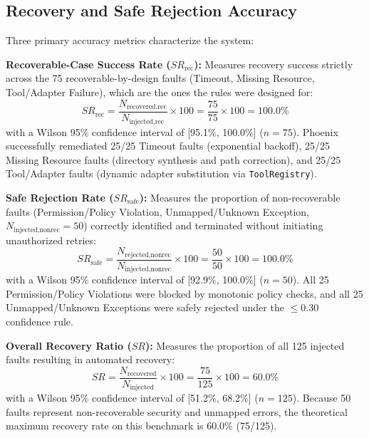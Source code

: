\documentclass[conference]{IEEEtran}
\begin{document}
\subsection{Recovery and Safe Rejection Accuracy}
Three primary accuracy metrics characterize the system:

\textbf{Recoverable-Case Success Rate ($SR_{\text{rec}}$):} Measures recovery success strictly across the 75 recoverable-by-design faults (Timeout, Missing Resource, Tool/Adapter Failure), which are the ones the rules were designed for:
\begin{equation}
SR_{\text{rec}} = \frac{N_{\text{recovered,rec}}}{N_{\text{injected,rec}}} \times 100 = \frac{75}{75} \times 100 = 100.0\%
\end{equation}
with a Wilson 95\% confidence interval of [95.1\%, 100.0\%] ($n=75$). Phoenix successfully remediated 25/25 Timeout faults (exponential backoff), 25/25 Missing Resource faults (directory synthesis and path correction), and 25/25 Tool/Adapter faults (dynamic adapter substitution via \texttt{ToolRegistry}).

\textbf{Safe Rejection Rate ($SR_{\text{safe}}$):} Measures the proportion of non-recoverable faults (Permission/Policy Violation, Unmapped/Unknown Exception, $N_{\text{injected,nonrec}} = 50$) correctly identified and terminated without initiating unauthorized retries:
\begin{equation}
SR_{\text{safe}} = \frac{N_{\text{rejected,nonrec}}}{N_{\text{injected,nonrec}}} \times 100 = \frac{50}{50} \times 100 = 100.0\%
\end{equation}
with a Wilson 95\% confidence interval of [92.9\%, 100.0\%] ($n=50$). All 25 Permission/Policy Violations were blocked by monotonic policy checks, and all 25 Unmapped/Unknown Exceptions were safely rejected under the $\le 0.30$ confidence rule.

\textbf{Overall Recovery Ratio ($SR$):} Measures the proportion of all 125 injected faults resulting in automated recovery:
\begin{equation}
SR = \frac{N_{\text{recovered}}}{N_{\text{injected}}} \times 100 = \frac{75}{125} \times 100 = 60.0\%
\end{equation}
with a Wilson 95\% confidence interval of [51.2\%, 68.2\%] ($n=125$). Because 50 faults represent non-recoverable security and unmapped errors, the theoretical maximum recovery rate on this benchmark is 60.0\% (75/125).
\end{document}

